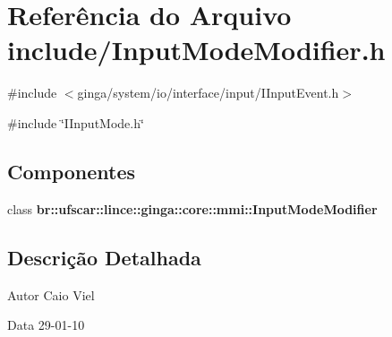\section{Referência do Arquivo include/InputModeModifier.h}
\label{InputModeModifier_8h}
{\ttfamily \#include $<$ginga/system/io/interface/input/IInputEvent.h$>$}\par
{\ttfamily \#include \char`\"{}IInputMode.h\char`\"{}}\par
\subsection*{Componentes}
\begin{DoxyCompactItemize}
\item 
class {\bf br::ufscar::lince::ginga::core::mmi::InputModeModifier}
\end{DoxyCompactItemize}


\subsection{Descrição Detalhada}
\begin{DoxyAuthor}{Autor}
Caio Viel 
\end{DoxyAuthor}
\begin{DoxyDate}{Data}
29-\/01-\/10 
\end{DoxyDate}
